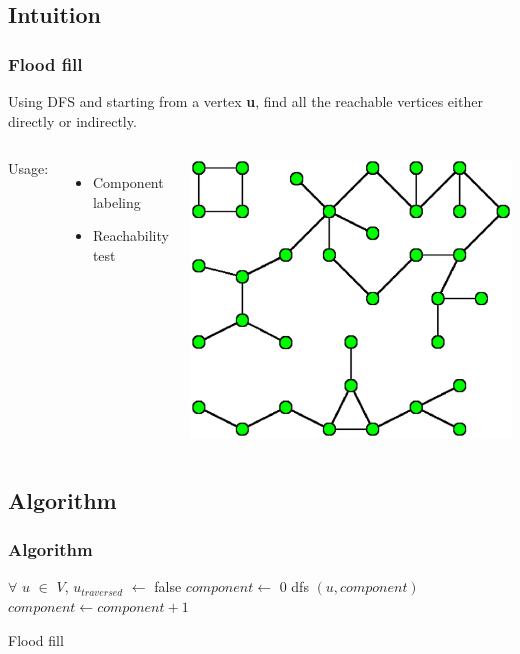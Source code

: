 \documentclass[article]{beamer}
\begin{document}
\subsection{Intuition}
\begin{frame}
	\frametitle{Flood fill}
	Using DFS and starting from a vertex \textbf{u}, find all the reachable vertices either directly or indirectly.
	
	\vspace{5mm}
	
	\begin{columns}
	Usage:
	\begin{itemize}
		\item Component labeling
		\item Reachability test
	\end{itemize}
	\includegraphics[scale=0.3]{./figures/forest.eps}
	\end{columns}
\end{frame}

\subsection{Algorithm}
\begin{frame}
	\frametitle{Algorithm}
	
		\begin{algorithm}[H]
		\begin{algorithmic}[1]
		\STATE $\forall$ $u$ $\in$ $V$, $u_{traversed}$ $\gets$ false		
		\STATE $component \gets$ 0		
		\STATE dfs $(u, component)$
		\STATE $component \gets component + 1$
		\ENDIF
		\ENDFOR		
		
		\end{algorithmic}
		\caption{Flood fill}
		\label{alg:seq}
		\end{algorithm}	
	
\end{frame}
\end{document}
